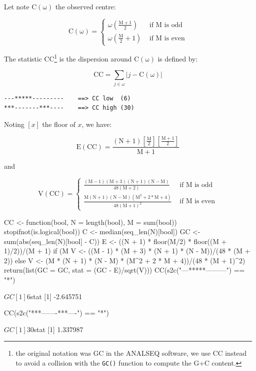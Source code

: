 \documentclass{article}
\begin{document}
Let note $\mathrm{C(\omega)}$ the observed centre:

$$
\mathrm{C(\omega)} = \left\{ \begin{array}{rl}
 \omega\left(\mathrm{\frac{M+1}{2}}\right) &\mbox{ if $\mathrm{M}$ is odd} \\
 \omega\left(\mathrm{\frac{M}{2} + 1}\right) &\mbox{ if $\mathrm{M}$ is even}
       \end{array} \right.
$$

The statistic $\mathrm{CC}$\footnote{
the original notation was GC in the ANALSEQ software, we use CC instead to
avoid a collision with the \texttt{GC()} function to compute the G+C content.
} is the dispersion around $\mathrm{C(\omega)}$ is defined by:

$$
\mathrm{CC} = \sum_{j \in \omega}{\left| j - \mathrm{C(\omega)} \right|}
$$

\begin{verbatim}
---*****---------    ==> CC low  (6)
***-------***----    ==> CC high (30)
\end{verbatim}

Noting $\left[x\right]$ the floor of $x$, we have:

$$
\mathrm{E(CC)} = \mathrm{\frac{(N+1)\left[\frac{M}{2}\right]\left[\frac{M+1}{2}\right]}{M+1}}
$$

and

$$
\mathrm{V(CC)} = \left\{ \begin{array}{rl}
 \mathrm{\frac{(M - 1)(M + 3)(N + 1)(N - M)}{48(M + 2)}} &\mbox{ if $\mathrm{M}$ is odd} \\
 \mathrm{\frac{M(N + 1)(N - M)(M^2 + 2*M + 4)}{48(M + 1)^2}} &\mbox{ if $\mathrm{M}$ is even}
       \end{array} \right.
$$

\begin{Schunk}
\begin{Sinput}
 CC <- function(bool, N = length(bool), M = sum(bool)) {
     stopifnot(is.logical(bool))
     C <- median(seq_len(N)[bool])
     GC <- sum(abs(seq_len(N)[bool] - C))
     E <- ((N + 1) * floor(M/2) * floor((M + 1)/2))/(M + 1)
     if (M%
         V <- ((M - 1) * (M + 3) * (N + 1) * (N - M))/(48 * 
             (M + 2))
     else V <- (M * (N + 1) * (N - M) * (M^2 + 2 * M + 4))/(48 * 
         (M + 1)^2)
     return(list(GC = GC, stat = (GC - E)/sqrt(V)))
 }
 CC(s2c("---*****---------") == "*")
\end{Sinput}
\begin{Soutput}
$GC
[1] 6

$stat
[1] -2.645751
\end{Soutput}
\begin{Sinput}
 CC(s2c("***-------***----") == "*")
\end{Sinput}
\begin{Soutput}
$GC
[1] 30

$stat
[1] 1.337987
\end{Soutput}
\end{Schunk}
\end{document}
